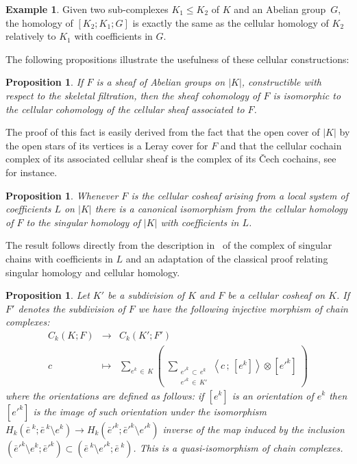 \documentclass[10pt]{amsart}
\newtheorem{prop}[theo]{Proposition}
\theoremstyle{definition}
\newtheorem{exam}[theo]{Example}
\numberwithin{equation}{section}
\numberwithin{figure}{section}
\begin{document}
\begin{exam}
Given two sub-complexes $K_1\leq K_2$ of $K$ and an Abelian group~$G$, the homology of $[K_2;K_1;G]$ is exactly the same as the cellular homology of $K_2$ relatively to $K_1$ with coefficients in $G$.
\end{exam}

The following propositions illustrate the usefulness of these cellular constructions:

\begin{prop}
If $F$ is a sheaf of Abelian groups on $|K|$, constructible with respect to the skeletal filtration, then the sheaf cohomology of $F$ is isomorphic to the cellular cohomology of the cellular sheaf associated to $F$.
\end{prop}

The proof of this fact is easily derived from the fact that the open cover of $|K|$ by the open stars of its vertices is a Leray cover for $F$ and that the cellular cochain complex of its associated cellular sheaf is the complex of its \v Cech cochains, see~\cite[Théorème~5.10.1 p.~228]{God_top_alg}
for instance.

\begin{prop}
Whenever $F$ is the cellular cosheaf arising from a local system of coefficients $L$ on $|K|$ there is a canonical isomorphism from the cellular homology of $F$ to the singular homology of $|K|$ with coefficients in $L$.
\end{prop}

The result follows directly from the description in~\cite[Section~3.H. Local Coefficients pp.~327-337.]{Hat_alg_top}
of the complex of singular chains with coefficients in $L$ and an adaptation of the classical proof relating singular homology and cellular homology.

\begin{prop}
Let $K'$ be a subdivision of $K$ and $F$ be a cellular cosheaf on $K$. If $F'$ denotes the subdivision of $F$ we have the following injective morphism of chain complexes:
\begin{equation*}
\begin{array}{rcl}
C_k(K;F) & \longrightarrow & C_k(K';F') \\%
c & \longmapsto & \displaystyle \sum_{e^k\,\in\,K} \left(\;\sum_{\substack{e'^k\,\subset\,e^k\\ e'^k\,\in\,K'}} \left\langle c\,;\,[e^k]\right\rangle\otimes [e'^k]\; \right)
\end{array}
\end{equation*}
where the orientations are defined as follows: if $[e^k]$ is an orientation of $e^k$ then $[e'^k]$ is the image of such orientation under the isomorphism $H_k(\bar{e}\,^k;\bar{e}\,^k\setminus e^k)\rightarrow H_k(\bar{e}'^k;\bar{e}'^k\setminus e'^k)$ inverse of the map induced by the inclusion $({\bar{e}'^k\setminus e^k};\bar{e}'^k)\subset(\bar{e}\,^k\setminus e'^k;\bar{e}\,^k)$. This is a quasi-isomorphism of chain complexes.
\end{prop}
\end{document}
